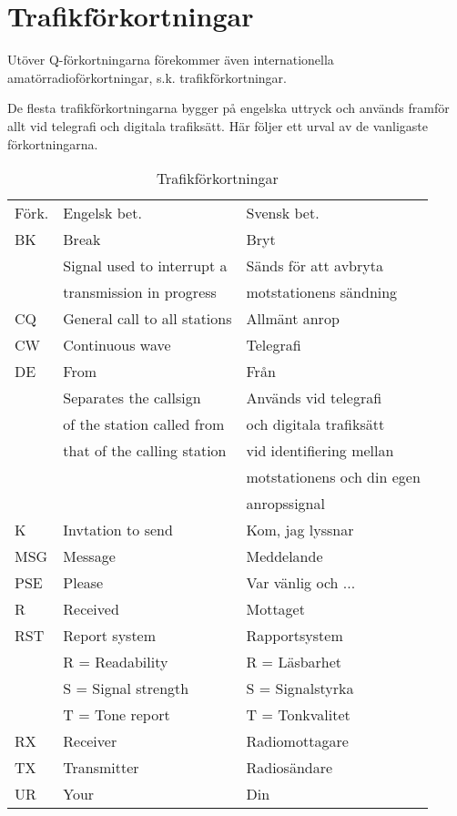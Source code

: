 \section{Trafikförkortningar}

Utöver Q-förkortningarna förekommer även internationella
amatörradioförkortningar, s.k. trafikförkortningar.

De flesta trafikförkortningarna bygger på engelska uttryck och används
framför allt vid telegrafi och digitala trafiksätt. Här följer ett
urval av de vanligaste förkortningarna.

\begin{table}[h]
  \begin{tabular}{lll}
    Förk. & Engelsk bet. & Svensk bet.\\
    BK & Break & Bryt\\
    & Signal used to interrupt a & Sänds för att avbryta\\
    & transmission in progress  & motstationens sändning\\
    CQ & General call to all stations & Allmänt anrop\\
    CW & Continuous wave & Telegrafi\\
    DE & From & Från\\
    & Separates the callsign      & Används vid telegrafi \\
    & of the station called from  & och digitala trafiksätt\\
    & that of the calling station & vid identifiering mellan\\
    &                             & motstationens och din egen\\
    &                             & anropssignal\\
    K & Invtation to send & Kom, jag lyssnar\\
    MSG & Message & Meddelande\\
    PSE & Please & Var vänlig och ...\\
    R & Received & Mottaget\\
    RST & Report system & Rapportsystem\\
    & R = Readability & R = Läsbarhet\\
    & S = Signal strength & S = Signalstyrka\\
    & T = Tone report & T = Tonkvalitet\\
    RX & Receiver & Radiomottagare\\
    TX & Transmitter & Radiosändare\\
    UR & Your & Din\\
  \end{tabular}
  \caption{Trafikförkortningar}
  \label{tab:trafikforkortningar}
\end{table}

